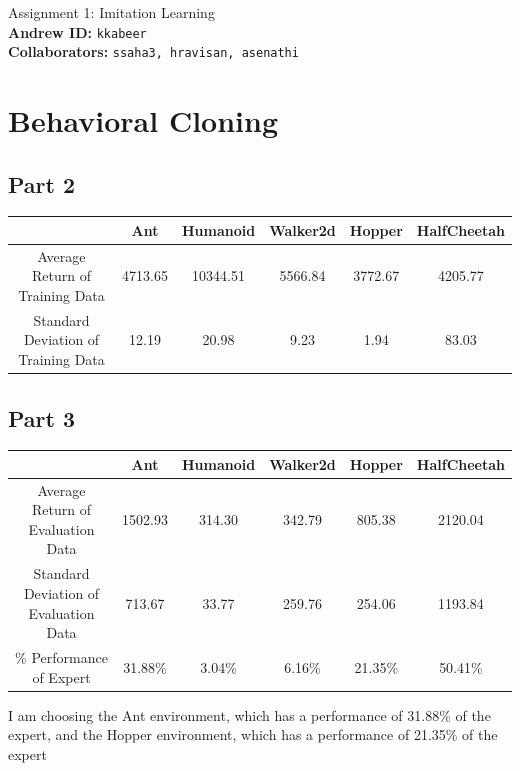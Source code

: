 \documentclass{article}
\begin{document}

\begin{centering}
    {\Large Assignment 1: Imitation Learning} \\
    \vspace{.25cm}
    \textbf{Andrew ID:} \texttt{kkabeer} \\
    \textbf{Collaborators:} \texttt{ssaha3, hravisan, asenathi}\\ 
\end{centering}

\vspace{.5cm}

\section{Behavioral Cloning}
\subsection{Part 2}

\begin{center}
  \begin{tabular}{ |c|c|c|c|c|c| } 
   \hline
    & Ant & Humanoid & Walker2d & Hopper & HalfCheetah \\ 
    \hline
   Average Return of Training Data & 4713.65 & 10344.51 & 5566.84 & 3772.67 & 4205.77 \\ 
   Standard Deviation of Training Data & 12.19 & 20.98 & 9.23 & 1.94 & 83.03\\ 
   \hline
  \end{tabular}
\end{center}

\subsection{Part 3}

\begin{center}
  \begin{tabular}{ |c|c|c|c|c|c| } 
   \hline
    & Ant & Humanoid & Walker2d & Hopper & HalfCheetah \\ 
    \hline
   Average Return of Evaluation Data & 1502.93 & 314.30 & 342.79 & 805.38 & 2120.04 \\ 
   Standard Deviation of Evaluation Data & 713.67 & 33.77 & 259.76 & 254.06 & 1193.84 \\
   \% Performance of Expert & 31.88\% & 3.04\% & 6.16\% & 21.35\% & 50.41\% \\
   \hline
  \end{tabular}
\end{center}
I am choosing the Ant environment, which has a performance of 31.88\% of the expert, and the Hopper environment, which has a performance of 21.35\% of the expert
\end{document}
